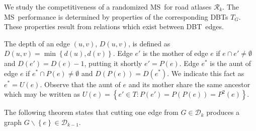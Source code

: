 \documentclass[preprint]{elsarticle}
\newcommand{\set}[1]{\left\{ #1 \right\}}
\newcommand{\mcalr}{\mathcal{R}}
\newcommand{\mcald}{\mathcal{D}}
\newcommand{\mts}{MS}
\newcommand{\ebt}{DBT}
\begin{document}
We study the competitiveness of a randomized \mts ~for road atlases $\mcalr_k$. The \mts ~performance is determined by properties of the corresponding \ebt s $T_G$. These properties result from relations which exist between \ebt ~edges.

The depth of an edge $(u,v)$, $D(u,v)$, is defined as $D(u,v) = \min \set{d(u),d(v)}$. Edge $e'$ is the mother of edge $e$ if $e \cap e' \neq \emptyset$ and $D(e') = D(e) - 1$, putting it shortly $e' = P(e)$. Edge $e^*$ is the aunt of edge $e$ if $e^* \cap P(e) \neq \emptyset$ and $D\left(P(e)\right) = D(e^*)$. We indicate this fact as $e^* = U(e)$. Observe that the aunt of $e$ and its mother share the same ancestor which may be written as $U(e) = \set{e' \in T: P(e') = P(P(e)) = P^2(e)}$.

The following theorem states that cutting one edge from $G \in \mcald_k$ produces a graph $G \backslash \set{e} \in \mcald_{k-1}$.
\end{document}
